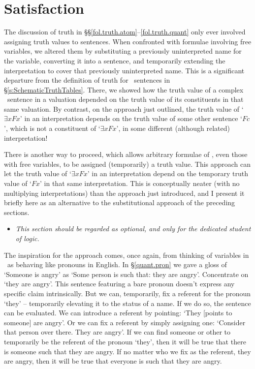 \section{Satisfaction} \label{s:Sats} %

The discussion of truth in §§\ref{fol.truth.atom}–\ref{fol.truth.quant} only ever involved assigning truth values to sentences. When confronted with formulae involving free variables, we altered them by substituting a previously uninterpreted name for the variable, converting it into a sentence, and temporarily extending the interpretation to cover that previously uninterpreted name. This is a significant departure from the definition of truth for \TFL\ sentences in §\ref{s:SchematicTruthTables}. There, we showed how the truth value of a complex \TFL\ sentence in a valuation depended on the truth value of its constituents in that same valuation. By contrast, on the approach just outlined, the truth value of `$\exists x Fx$' in an interpretation depends on the truth value of some other sentence `$Fc$', which is not a constituent of `$\exists x Fx$', in some different (although related) interpretation! 

There is another way to proceed, which allows arbitrary formulae of \FOL, even those with free variables, to be assigned (temporarily) a truth value. This approach can let the truth value of `$\exists x Fx$' in an interpretation depend on the temporary truth value of `$Fx$' in that same interpretation. This is conceptually neater (with no multiplying interpretations) than the approach just introduced, and I present it briefly here as an alternative to the substitutional approach of the preceding sections.

\begin{itemize}
 	\item \emph{This section should be regarded as optional, and only for the dedicated student of logic.}
 \end{itemize} 

The inspiration for the approach comes, once again, from thinking of variables in \FOL\ as behaving like pronouns in English. In §\ref{quant.pron} we gave a gloss of `Someone is angry' as `Some person is such that: they are angry'. Concentrate on `they are angry'. This sentence featuring a bare pronoun doesn't express any specific claim intrinsically. But we can, temporarily, fix a referent for the pronoun `they' – temporarily elevating it to the status of a name. If we do so, the sentence can be evaluated. We can introduce a referent by pointing: `They [points to someone] are angry'. Or we can fix a referent by simply assigning one: `Consider that person over there. They are angry'. If we can find someone or other to temporarily be the referent of the pronoun `they', then it will be true that there is someone such that they are angry. If no matter who we fix as the referent, they are angry, then it will be true that everyone is such that they are angry. 

